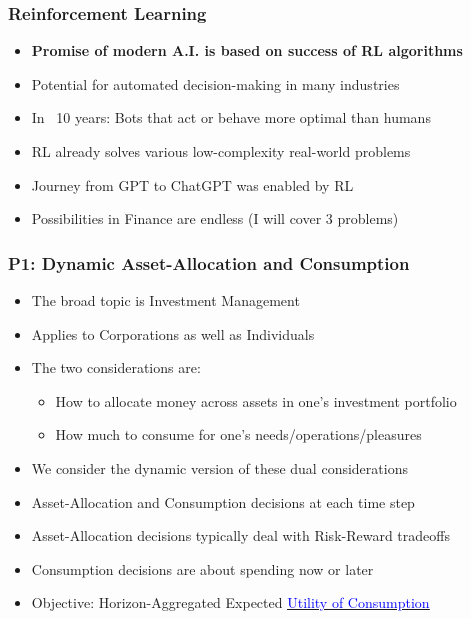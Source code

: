 \documentclass[handout]{beamer}
\begin{document}
\begin{frame}
\frametitle{Reinforcement Learning}
\pause
\begin{itemize}[<+->]

\item {\bf Promise of modern A.I. is based on success of RL algorithms}
\item Potential for automated decision-making in many industries
\item In ~10 years: Bots that act or behave more optimal than humans
\item RL already solves various low-complexity real-world problems
\item Journey from GPT to ChatGPT was enabled by RL
\item Possibilities in Finance are endless (I will cover 3 problems)
\end{itemize}
\end{frame}


\begin{frame}
\frametitle{P1: Dynamic Asset-Allocation and Consumption}
\pause
\begin{itemize}[<+->]
\item The broad topic is Investment Management
\item Applies to Corporations as well as Individuals
\item The two considerations are:
\pause
\begin{itemize}[<+->]
\item How to allocate money across assets in one's investment portfolio
\item How much to consume for one's needs/operations/pleasures
\end{itemize}
\item We consider the dynamic version of these dual considerations
\item Asset-Allocation and Consumption decisions at each time step
\item Asset-Allocation decisions typically deal with Risk-Reward tradeoffs
\item Consumption decisions are about spending now or later
\item Objective: Horizon-Aggregated Expected \href{https://github.com/coverdrive/technical-documents/blob/master/finance/cme241/Tour-UtilityTheory.pdf}{\underline{\textcolor{blue}{Utility of Consumption}}}
\end{itemize}
\end{frame}
\end{document}
